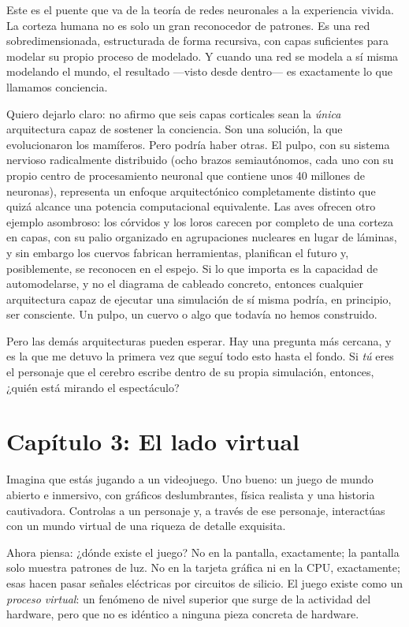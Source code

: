 \documentclass[11pt, twoside, openright]{book}
\begin{document}
Este es el puente que va de la teoría de redes neuronales a la experiencia vivida. La corteza humana no es solo un gran reconocedor de patrones. Es una red sobredimensionada, estructurada de forma recursiva, con capas suficientes para modelar su propio proceso de modelado. Y cuando una red se modela a sí misma modelando el mundo, el resultado ---visto desde dentro--- es exactamente lo que llamamos conciencia.

Quiero dejarlo claro: no afirmo que seis capas corticales sean la \textit{única} arquitectura capaz de sostener la conciencia. Son una solución, la que evolucionaron los mamíferos. Pero podría haber otras. El pulpo, con su sistema nervioso radicalmente distribuido (ocho brazos semiautónomos, cada uno con su propio centro de procesamiento neuronal que contiene unos 40 millones de neuronas), representa un enfoque arquitectónico completamente distinto que quizá alcance una potencia computacional equivalente. Las aves ofrecen otro ejemplo asombroso: los córvidos y los loros carecen por completo de una corteza en capas, con su palio organizado en agrupaciones nucleares en lugar de láminas, y sin embargo los cuervos fabrican herramientas, planifican el futuro y, posiblemente, se reconocen en el espejo. Si lo que importa es la capacidad de automodelarse, y no el diagrama de cableado concreto, entonces cualquier arquitectura capaz de ejecutar una simulación de sí misma podría, en principio, ser consciente. Un pulpo, un cuervo o algo que todavía no hemos construido.

Pero las demás arquitecturas pueden esperar. Hay una pregunta más cercana, y es la que me detuvo la primera vez que seguí todo esto hasta el fondo. Si \textit{tú} eres el personaje que el cerebro escribe dentro de su propia simulación, entonces, ¿quién está mirando el espectáculo?


\chapter*{Capítulo 3: El lado virtual}

Imagina que estás jugando a un videojuego. Uno bueno: un juego de mundo abierto e inmersivo, con gráficos deslumbrantes, física realista y una historia cautivadora. Controlas a un personaje y, a través de ese personaje, interactúas con un mundo virtual de una riqueza de detalle exquisita.

Ahora piensa: ¿dónde existe el juego? No en la pantalla, exactamente; la pantalla solo muestra patrones de luz. No en la tarjeta gráfica ni en la CPU, exactamente; esas hacen pasar señales eléctricas por circuitos de silicio. El juego existe como un \textit{proceso virtual}: un fenómeno de nivel superior que surge de la actividad del hardware, pero que no es idéntico a ninguna pieza concreta de hardware.
\end{document}
